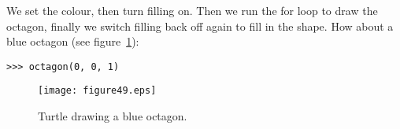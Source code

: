 We set the colour, then turn filling on.  Then we run the for loop to draw the octagon, finally we switch filling back off again to fill in the shape. How about a blue octagon (see figure~\ref{fig49}):

\begin{Verbatim}[frame=single]
>>> octagon(0, 0, 1)
\end{Verbatim}

\begin{figure}
\begin{center}
\texttt{[image: figure49.eps]}
\end{center}
\caption{Turtle drawing a blue octagon.}\label{fig49}
\end{figure}
\newpage

